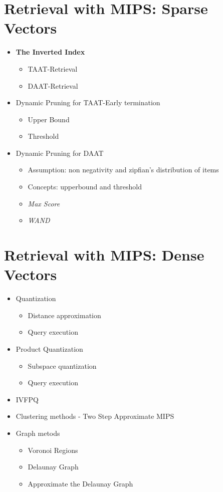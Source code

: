 \documentclass[12pt,oneside]{report}
\begin{document}
\chapter{Retrieval with MIPS: Sparse Vectors}
\begin{itemize}
    \item \textbf{The Inverted Index}
    \begin{itemize}
        \item TAAT-Retrieval
        \item DAAT-Retrieval
    \end{itemize}
    \item Dynamic Pruning for TAAT-Early termination
    \begin{itemize}
        \item Upper Bound
        \item Threshold
    \end{itemize}
    \item Dynamic Pruning for DAAT
    \begin{itemize}
        \item Assumption: non negativity and zipfian's distribution of items
        \item Concepts: upperbound and threshold
        \item \textit{Max Score}
        \item \textit{WAND}
    \end{itemize}
\end{itemize}

\chapter{Retrieval with MIPS: Dense Vectors}
\begin{itemize}
    \item Quantization
    \begin{itemize}
        \item Distance approximation
        \item Query execution
    \end{itemize}
    \item Product Quantization
    \begin{itemize}
        \item Subspace quantization
        \item Query execution
    \end{itemize}
    \item IVFPQ
    \item Clustering methods - Two Step Approximate MIPS
    \item Graph metods
    \begin{itemize}
        \item Voronoi Regions
        \item Delaunay Graph
        \item Approximate the Delaunay Graph 
    \end{itemize}
\end{itemize}
\end{document}
